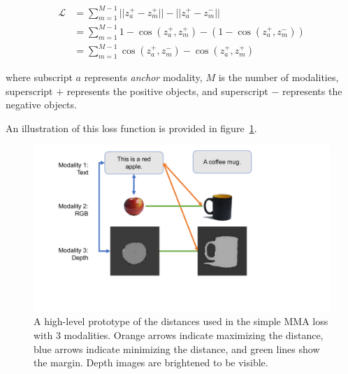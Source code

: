 \documentclass[sigconf,natbib=true,anonymous=true]{acmart}
\begin{document}

\begin{equation}
\label{eq:objective-simple-mma}
\begin{split}
    \mathcal{L}  &= \sum_{m=1}^{M-1} || z_{a}^{+} - z_{m}^{+} || - || z_{a}^{+} - z_{m}^{-} || \\
    &= \sum_{m=1}^{M-1} 1 - \cos(z_{a}^{+}, z_{m}^{+}) - (1 - \cos(z_{a}^{+}, z_{m}^{-})) \\
    &= \sum_{m=1}^{M-1} \cos(z_{a}^{+} ,z_{m}^{-}) - \cos(z_{a}^{+}, z_{m}^{+})
\end{split}
\end{equation}

where subscript $a$ represents \textit{anchor} modality, $M$ is the number of modalities, superscript $+$ represents the positive objects, and superscript $-$ represents the negative objects.

An illustration of this loss function is provided in figure~\ref{fig:simple-mma-loss}.

\begin{figure}[tb]
\centering
\includegraphics[width=\columnwidth]{Figures/simple-MMA.pdf}
\caption{A high-level prototype of the distances used in the simple MMA loss with 3 modalities. Orange arrows indicate maximizing the distance, blue arrows indicate minimizing the distance, and green lines show the margin. Depth images are brightened to be visible. }
\label{fig:simple-mma-loss}
\end{figure}
\end{document}
